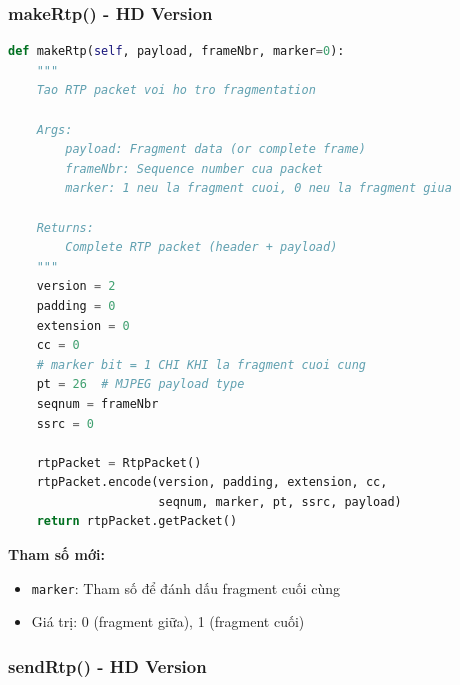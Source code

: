 \subsubsection{makeRtp() - HD Version}

\begin{lstlisting}[language=Python, caption={Make RTP Packet with Fragmentation Support}]
def makeRtp(self, payload, frameNbr, marker=0):
    """
    Tao RTP packet voi ho tro fragmentation
    
    Args:
        payload: Fragment data (or complete frame)
        frameNbr: Sequence number cua packet
        marker: 1 neu la fragment cuoi, 0 neu la fragment giua
    
    Returns:
        Complete RTP packet (header + payload)
    """
    version = 2
    padding = 0
    extension = 0
    cc = 0
    # marker bit = 1 CHI KHI la fragment cuoi cung
    pt = 26  # MJPEG payload type
    seqnum = frameNbr
    ssrc = 0
    
    rtpPacket = RtpPacket()
    rtpPacket.encode(version, padding, extension, cc, 
                     seqnum, marker, pt, ssrc, payload)
    return rtpPacket.getPacket()
\end{lstlisting}

\textbf{Tham số mới:}
\begin{itemize}
    \item \texttt{marker}: Tham số để đánh dấu fragment cuối cùng
    \item Giá trị: 0 (fragment giữa), 1 (fragment cuối)
\end{itemize}

\subsubsection{sendRtp() - HD Version}

